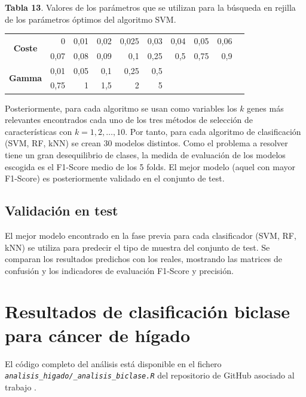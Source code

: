 \newpage
\textbf{Tabla 13}. Valores de los parámetros que se utilizan para la búsqueda en rejilla de los parámetros óptimos del algoritmo SVM.

\begin{table}[H]
	\centering
	\begin{tabular}{crrrrrrrrr}
		\hline
		\multirow{2}{*}{\textbf{Coste}} & 0    & 0,01 & 0,02         & 0,025                             & 0,03 & 0,04 & 0,05 & 0,06 \\
		& 0,07 & 0,08 & 0,09         & 0,1                               & 0,25 & 0,5  & 0,75 & 0,9  \\ \hline
		\multirow{2}{*}{\textbf{Gamma}} & 0,01 & 0,05 & 0,1 & 0,25 & 0,5  &      &      &      \\
		& 0,75 & 1    & 1,5          & 2                                 & 5    &      &      &      \\ \hline
	\end{tabular}
\end{table}

Posteriormente, para cada algoritmo se usan como variables los $k$ genes más relevantes encontrados cada uno de los tres métodos de selección de características con $k = 1, 2, \hdots, 10$. Por tanto, para cada algoritmo de clasificación (SVM, RF, kNN) se crean 30 modelos distintos. Como el problema a resolver tiene un gran desequilibrio de clases, la medida de evaluación de los modelos escogida es el F1-Score medio de los 5 folds. El mejor modelo (aquel con mayor F1-Score) es posteriormente validado en el conjunto de test.

\subsection{Validación en test}

El mejor modelo encontrado en la fase previa para cada clasificador (SVM, RF, kNN) se utiliza para predecir el tipo de muestra del conjunto de test. Se comparan los resultados predichos con los reales, mostrando las matrices de confusión y los indicadores de evaluación F1-Score y precisión.

\section{Resultados de clasificación biclase para cáncer de hígado}

El código completo del análisis está disponible en el fichero \textit{\texttt{analisis\_higado/\_analisis\_biclase.R}} del repositorio de GitHub asociado al trabajo \cite{Redondo-Sanchez2020}.

